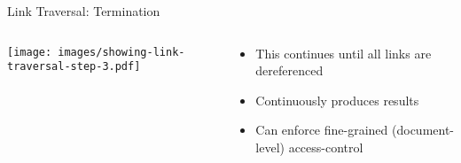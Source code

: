 \begin{frame}{Link Traversal: Termination}
    \begin{columns}[T] %
        \begin{column}{0.6\textwidth} %
            \texttt{[image: images/showing-link-traversal-step-3.pdf]} %
        \end{column}

        \begin{column}{0.4\textwidth} %
            \begin{itemize}
                \item This continues until all links are dereferenced
                \item Continuously produces results
                \item Can enforce fine-grained (document-level) access-control

            \end{itemize}
        \end{column}
    \end{columns}
\end{frame}